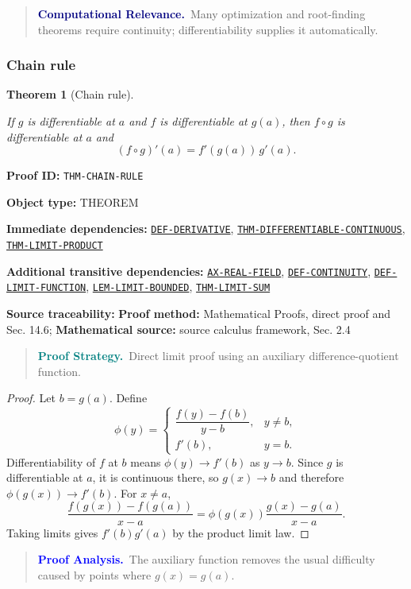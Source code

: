 \documentclass[10pt]{article}
\newcommand{\pidraw}[1]{\begingroup\urlstyle{tt}\nolinkurl{#1}\endgroup}
\newcommand{\pidref}[1]{\hyperref[prf:#1]{\pidraw{#1}}}
\newtheorem{theorem}{Theorem}[section]
\theoremstyle{definition}
\theoremstyle{remark}
\newenvironment{proofstrategy}
{\begin{quote}\small\noindent\textbf{\textcolor{teal}{Proof Strategy.}}\ }
{\end{quote}}
\newenvironment{proofanalysis}
{\begin{quote}\small\noindent\textbf{\textcolor{blue}{Proof Analysis.}}\ }
{\end{quote}}
\newenvironment{computationalrelevance}
{\begin{quote}\small\noindent\textbf{\textcolor{navy}{Computational Relevance.}}\ }
{\end{quote}}
\newcommand{\meta}[2]{\noindent\textbf{#1:} #2\par}
\begin{document}
\begin{computationalrelevance}Many optimization and root-finding theorems require continuity; differentiability supplies it automatically.\end{computationalrelevance}

\subsubsection{Chain rule}

\begin{theorem}[Chain rule]\label{prf:THM-CHAIN-RULE}

If $g$ is differentiable at $a$ and $f$ is differentiable at $g(a)$, then $f\circ g$ is differentiable at $a$ and
\[
(f\circ g)'(a)=f'(g(a))\,g'(a).
\]

\end{theorem}

\meta{Proof ID}{\pidraw{THM-CHAIN-RULE}}
\meta{Object type}{THEOREM}
\meta{Immediate dependencies}{\pidref{DEF-DERIVATIVE}, \pidref{THM-DIFFERENTIABLE-CONTINUOUS}, \pidref{THM-LIMIT-PRODUCT}}
\meta{Additional transitive dependencies}{\pidref{AX-REAL-FIELD}, \pidref{DEF-CONTINUITY}, \pidref{DEF-LIMIT-FUNCTION}, \pidref{LEM-LIMIT-BOUNDED}, \pidref{THM-LIMIT-SUM}}
\meta{Source traceability}{\textbf{Proof method:} Mathematical Proofs, direct proof and Sec. 14.6; \textbf{Mathematical source:} source calculus framework, Sec. 2.4}

\begin{proofstrategy}Direct limit proof using an auxiliary difference-quotient function.\end{proofstrategy}

\begin{proof}

Let $b=g(a)$. Define
\[
\phi(y)=
\begin{cases}
\dfrac{f(y)-f(b)}{y-b},&y\ne b,\\[4pt]
f'(b),&y=b.
\end{cases}
\]
Differentiability of $f$ at $b$ means $\phi(y)\to f'(b)$ as $y\to b$.
Since $g$ is differentiable at $a$, it is continuous there, so $g(x)\to b$ and
therefore $\phi(g(x))\to f'(b)$. For $x\ne a$,
\[
\frac{f(g(x))-f(g(a))}{x-a}
=
\phi(g(x))\frac{g(x)-g(a)}{x-a}.
\]
Taking limits gives $f'(b)g'(a)$ by the product limit law.

\end{proof}

\begin{proofanalysis}The auxiliary function removes the usual difficulty caused by points where $g(x)=g(a)$.\end{proofanalysis}
\end{document}
